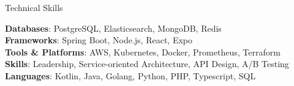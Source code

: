 \documentclass[
	10pt, %
]{resume} %
\begin{document}

\begin{rSection}{Technical Skills}

    \textbf{Databases}: PostgreSQL, Elasticsearch, MongoDB, Redis \\
    \textbf{Frameworks}: Spring Boot, Node.js, React, Expo \\
    \textbf{Tools \& Platforms}: AWS, Kubernetes, Docker, Prometheus, Terraform \\
    \textbf{Skills}: Leadership, Service-oriented Architecture, API Design, A/B Testing \\
    \textbf{Languages}: Kotlin, Java, Golang, Python, PHP, Typescript, SQL \\

\end{rSection}






\end{document}
